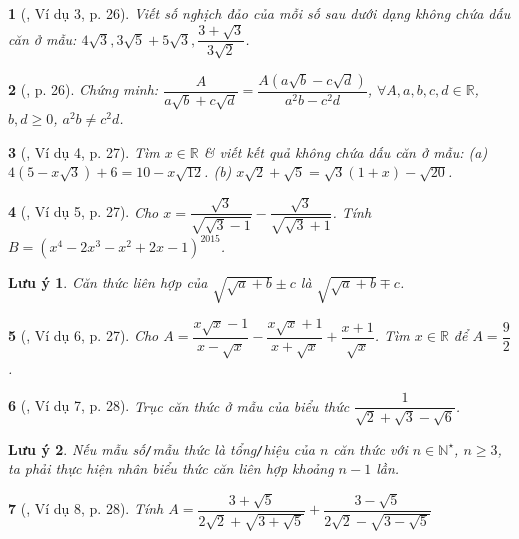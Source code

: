 \documentclass{article}
\newtheorem{baitoan}{}%
\newtheorem{luuy}{Lưu ý}
\begin{document}
\begin{baitoan}[\cite{Binh_boi_duong_Toan_9_tap_1}, Ví dụ 3, p. 26]
	Viết số nghịch đảo của mỗi số sau dưới dạng không chứa dấu căn ở mẫu: $4\sqrt{3},3\sqrt{5} + 5\sqrt{3},\dfrac{3 + \sqrt{3}}{3\sqrt{2}}$.
\end{baitoan}

\begin{baitoan}[\cite{Binh_boi_duong_Toan_9_tap_1}, p. 26]
	Chứng minh: $\dfrac{A}{a\sqrt{b} + c\sqrt{d}} = \dfrac{A(a\sqrt{b} - c\sqrt{d})}{a^2b - c^2d}$, $\forall A,a,b,c,d\in\mathbb{R}$, $b,d\ge0$, $a^2b\ne c^2d$.
\end{baitoan}

\begin{baitoan}[\cite{Binh_boi_duong_Toan_9_tap_1}, Ví dụ 4, p. 27]
	Tìm $x\in\mathbb{R}$ \& viết kết quả không chứa dấu căn ở mẫu: (a) $4(5 - x\sqrt{3}) + 6 = 10 - x\sqrt{12}$. (b) $x\sqrt{2} + \sqrt{5} = \sqrt{3}(1 + x) - \sqrt{20}$.
\end{baitoan}

\begin{baitoan}[\cite{Binh_boi_duong_Toan_9_tap_1}, Ví dụ 5, p. 27]
	Cho $x = \dfrac{\sqrt{3}}{\sqrt{\sqrt{3} - 1}} - \dfrac{\sqrt{3}}{\sqrt{\sqrt{3} + 1}}$. Tính $B = (x^4 - 2x^3 - x^2 + 2x - 1)^{2015}$.
\end{baitoan}

\begin{luuy}
	Căn thức liên hợp của $\sqrt{\sqrt{a} + b}\pm c$ là $\sqrt{\sqrt{a} + b}\mp c$.
\end{luuy}

\begin{baitoan}[\cite{Binh_boi_duong_Toan_9_tap_1}, Ví dụ 6, p. 27]
	Cho $A = \dfrac{x\sqrt{x} - 1}{x - \sqrt{x}} - \dfrac{x\sqrt{x} + 1}{x + \sqrt{x}} + \dfrac{x + 1}{\sqrt{x}}$. Tìm $x\in\mathbb{R}$ để $A = \dfrac{9}{2}$.
\end{baitoan}

\begin{baitoan}[\cite{Binh_boi_duong_Toan_9_tap_1}, Ví dụ 7, p. 28]
	Trục căn thức ở mẫu của biểu thức $\dfrac{1}{\sqrt{2} + \sqrt{3} - \sqrt{6}}$.
\end{baitoan}

\begin{luuy}
	Nếu mẫu số{\tt/}mẫu thức là tổng{\tt/}hiệu của $n$ căn thức với $n\in\mathbb{N}^\star$, $n\ge3$, ta phải thực hiện nhân biểu thức căn liên hợp khoảng $n - 1$ lần.
\end{luuy}

\begin{baitoan}[\cite{Binh_boi_duong_Toan_9_tap_1}, Ví dụ 8, p. 28]
	Tính $A = \dfrac{3 + \sqrt{5}}{2\sqrt{2} + \sqrt{3 + \sqrt{5}}} + \dfrac{3 - \sqrt{5}}{2\sqrt{2} - \sqrt{3 - \sqrt{5}}}$
\end{baitoan}
\end{document}
